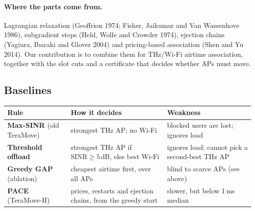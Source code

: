 \documentclass[11pt,a4paper]{article}
\begin{document}
\paragraph{Where the parts come from.}
Lagrangian relaxation (Geoffrion 1974; Fisher, Jaikumar and Van Wassenhove 1986), subgradient
steps (Held, Wolfe and Crowder 1974), ejection chains (Yagiura, Ibaraki and Glover 2004) and
pricing-based association (Shen and Yu 2014). Our contribution is to combine them for
THz/Wi-Fi airtime association, together with the slot cuts and a certificate that decides
whether APs must move.

\subsection{Baselines}
\begin{center}
\begin{tabular}{@{}>{\raggedright\arraybackslash}p{}>{\raggedright\arraybackslash}p{}>{\raggedright\arraybackslash}p{}@{}}
\toprule
Rule & How it decides & Weakness\\
\midrule
\textbf{Max-SINR} (old TeraMove) & strongest THz AP; no Wi-Fi & blocked users are lost; ignores load\\
\textbf{Threshold offload} & strongest THz AP if $\mathrm{SINR}\ge5$\,dB, else best Wi-Fi & ignores load; cannot pick a second-best THz AP\\
\textbf{Greedy GAP} (ablation) & cheapest airtime first, over all APs & blind to scarce APs (see above)\\
\textbf{PACE} (TeraMove-H) & prices, restarts and ejection chains, from the greedy start & slower, but below 1\,ms median\\
\bottomrule
\end{tabular}
\end{center}
\end{document}
